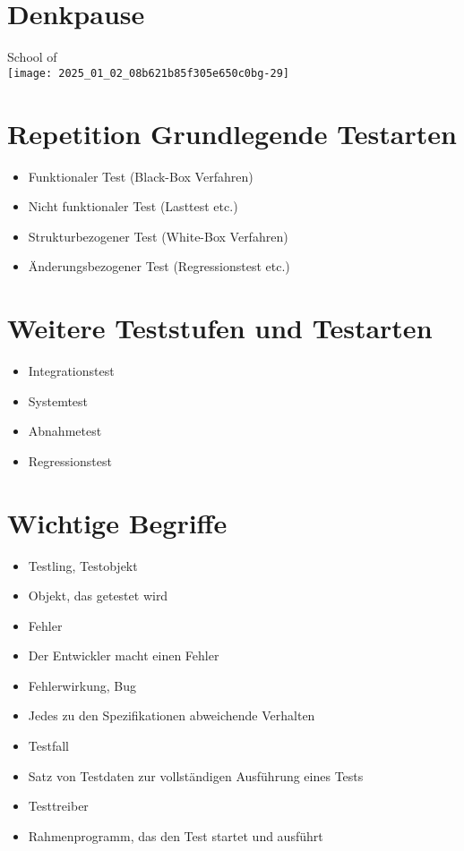 \documentclass[10pt]{article}
\begin{document}
\section*{Denkpause}
School of\\
\texttt{[image: 2025\_01\_02\_08b621b85f305e650c0bg-29]}

\section*{Repetition Grundlegende Testarten}
\begin{itemize}
  \item Funktionaler Test (Black-Box Verfahren)
  \item Nicht funktionaler Test (Lasttest etc.)
  \item Strukturbezogener Test (White-Box Verfahren)
  \item Änderungsbezogener Test (Regressionstest etc.)
\end{itemize}

\section*{Weitere Teststufen und Testarten}
\begin{itemize}
  \item Integrationstest
  \item Systemtest
  \item Abnahmetest
  \item Regressionstest
\end{itemize}

\section*{Wichtige Begriffe}
\begin{itemize}
  \item Testling, Testobjekt
  \item Objekt, das getestet wird
  \item Fehler
  \item Der Entwickler macht einen Fehler
  \item Fehlerwirkung, Bug
  \item Jedes zu den Spezifikationen abweichende Verhalten
  \item Testfall
  \item Satz von Testdaten zur vollständigen Ausführung eines Tests
  \item Testtreiber
  \item Rahmenprogramm, das den Test startet und ausführt
\end{itemize}
\end{document}
